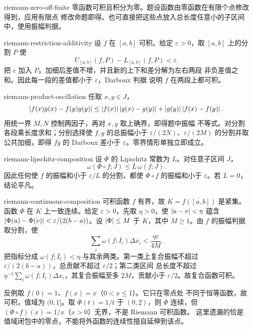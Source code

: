 \begin{solution}{riemann-zero-off-finite}
零函数可积且积分为零。题设函数由零函数在有限个点修改得到，应用有限点
修改命题即得。也可直接把这些点放入总长度任意小的子区间中，使用振幅判据。
\end{solution}

\begin{solution}{riemann-restriction-additivity}
设 \(f\) 在 \([a,b]\) 可积。给定 \(\varepsilon>0\)，取 \([a,b]\)
上的分割 \(P\) 使
\[
 U_{[a,b]}(f,P)-L_{[a,b]}(f,P)<\varepsilon.
\]
把 \(c\) 加入 \(P\)。加细后差值不增，并且新的上下和差分解为左右两段
非负差值之和。因此每一段的差值都小于 \(\varepsilon\)，Darboux 判据
说明 \(f\) 在两段上都可积。
\end{solution}

\begin{solution}{riemann-product-oscillation}
任取 \(x,y\in J\)，
\[
 \left|f(x)g(x)-f(y)g(y)\right|
 \le \left|f(x)\right|\left|g(x)-g(y)\right|
     +\left|g(y)\right|\left|f(x)-f(y)\right|.
\]
用统一界 \(M,N\) 控制两因子，再对 \(x,y\) 取上确界，即得题中振幅
不等式。对分割各段乘长度求和；分别选择使 \(f,g\) 的总振幅小于
\(\varepsilon/(2N)\)、\(\varepsilon/(2M)\) 的分割并取公共加细，即得
\(fg\) 的 Darboux 差小于 \(\varepsilon\)。零界情形单独立即成立。
\end{solution}

\begin{solution}{riemann-lipschitz-composition}
设 \(\Phi\) 的 Lipschitz 常数为 \(L\)。对任意子区间 \(J\)，
\[
 \omega(\Phi\circ f;J)\le L\,\omega(f;J).
\]
因此任何使 \(f\) 的振幅和小于 \(\varepsilon/L\) 的分割，都使
\(\Phi\circ f\) 的振幅和小于 \(\varepsilon\)。若 \(L=0\)，结论平凡。
\end{solution}

\begin{solution}{riemann-continuous-composition}
可积函数 \(f\) 有界，故 \(K=\overline{f([a,b])}\) 是紧集。
函数 \(\Phi\) 在 \(K\) 上一致连续。给定 \(\varepsilon>0\)，先取 \(\eta>0\)，使
\(\left|u-v\right|<\eta\) 蕴含
\(\left|\Phi(u)-\Phi(v)\right|<\varepsilon/(2(b-a))\)。设
\(\left|\Phi\right|\le M\) 于 \(K\)，其中 \(M\ge1\)。由 \(f\) 的振幅判据取分割，使
\[
 \sum_i\omega(f;I_i)\Delta x_i
 <\frac{\eta\varepsilon}{4M}.
\]
把指标分成 \(\omega(f;I_i)<\eta\) 与其余两类。第一类上复合振幅不超过
\(\varepsilon/(2(b-a))\)，总贡献不超过 \(\varepsilon/2\)；第二类区间
总长度不超过
\(\eta^{-1}\sum_i\omega(f;I_i)\Delta x_i\)，其复合振幅至多
\(2M\)，贡献小于 \(\varepsilon/2\)。故复合函数可积。

反例取 \(f(0)=1\)、\(f(x)=x\)（\(0<x\le1\)）。它只在零点处
不同于恒等函数，故可积，值域为 \((0,1]\)。取
\(\Phi(t)=1/t\) 于 \((0,2)\)，则 \(\Phi\) 连续，但
\((\Phi\circ f)(x)=1/x\)（\(x>0\)）无界，不是 Riemann 可积函数。
这里遗漏的恰是值域闭包中的零点，不能将外函数的连续性擅自延伸到该点。
\end{solution}

